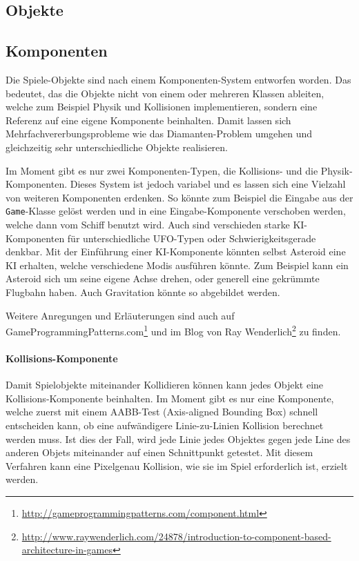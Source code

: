 \documentclass[12pt, a4paper, titlepage, hidelinks]{scrreprt}
\begin{document}
\subsection{Objekte}



\subsection{Komponenten}

Die Spiele-Objekte sind nach einem Komponenten-System entworfen worden. Das bedeutet, das die Objekte nicht von einem oder mehreren Klassen ableiten, welche zum Beispiel Physik und Kollisionen implementieren, sondern eine Referenz auf eine eigene Komponente beinhalten. Damit lassen sich Mehrfachvererbungsprobleme wie das Diamanten-Problem umgehen und gleichzeitig sehr unterschiedliche Objekte realisieren.

Im Moment gibt es nur zwei Komponenten-Typen, die Kollisions- und die Physik-Komponenten. Dieses System ist jedoch variabel und es lassen sich eine Vielzahl von weiteren Komponenten erdenken. So könnte zum Beispiel die Eingabe aus der \texttt{Game}-Klasse gelöst werden und in eine Eingabe-Komponente verschoben werden, welche dann vom Schiff benutzt wird. Auch sind verschieden starke KI-Komponenten für unterschiedliche UFO-Typen oder Schwierigkeitsgerade denkbar. Mit der Einführung einer KI-Komponente könnten selbst Asteroid eine KI erhalten, welche verschiedene Modis ausführen könnte. Zum Beispiel kann ein Asteroid sich um seine eigene Achse drehen, oder generell eine gekrümmte Flugbahn haben. Auch Gravitation könnte so abgebildet werden.

Weitere Anregungen und Erläuterungen sind auch auf GameProgrammingPatterns.com\footnote{\url{http://gameprogrammingpatterns.com/component.html}} und im Blog von Ray Wenderlich\footnote{\url{http://www.raywenderlich.com/24878/introduction-to-component-based-architecture-in-games}} zu finden.

\paragraph{Kollisions-Komponente}
Damit Spielobjekte miteinander Kollidieren können kann jedes Objekt eine Kollisions-Komponente beinhalten. Im Moment gibt es nur eine Komponente, welche zuerst mit einem AABB-Test (Axis-aligned Bounding Box) schnell entscheiden kann, ob eine aufwändigere Linie-zu-Linien Kollision berechnet werden muss. Ist dies der Fall, wird jede Linie jedes Objektes gegen jede Line des anderen Objets miteinander auf einen Schnittpunkt getestet. Mit diesem Verfahren kann eine Pixelgenau Kollision, wie sie im Spiel erforderlich ist, erzielt werden.
\end{document}
